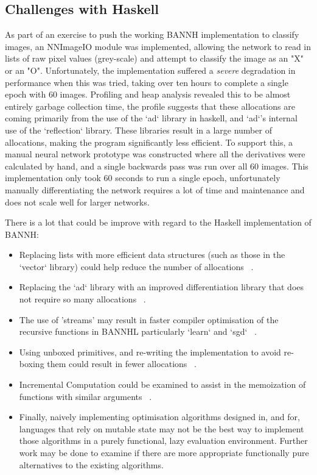 \documentclass[a4paper]{article}
\begin{document}
\subsection{Challenges with Haskell}
As part of an exercise to push the working BANNH implementation to classify
images, an NNImageIO module was implemented, allowing the network to read in
lists of raw pixel values (grey-scale) and attempt to classify the image as an
"X" or an "O". Unfortunately, the implementation suffered a \textit{severe}
degradation in performance when this was tried, taking over ten hours to
complete a single epoch with 60 images. Profiling and heap analysis revealed
this to be almost entirely garbage collection time, the profile suggests that
these allocations are coming primarily from the use of the `ad` library in
haskell, and `ad`'s internal use of the `reflection` library. These libraries
result in a large number of allocations, making the program significantly less
efficient. To support this, a manual neural network prototype was constructed
where all the derivatives were calculated by hand, and a single backwards pass
was run over all 60 images. This implementation only took 60 seconds to run a
single epoch, unfortunately manually differentiating the network requires a lot
of time and maintenance and does not scale well for larger networks.

There is a lot that could be improve with regard to the Haskell implementation
of BANNH:
\begin{itemize}
   \item Replacing lists with more efficient data structures (such as those in
   the `vector` library) could help reduce the number of allocations
   ~\cite{gill2000debugging}.
   \item Replacing the `ad` library with an improved differentiation library
   that does not require so many allocations ~\cite{zimmer2006functional}.
   \item The use of 'streams' may result in faster compiler optimisation of the
   recursive functions in BANNHL particularly `learn` and `sgd`
   ~\cite{ida1983functional}.
   \item Using unboxed primitives, and re-writing the implementation to avoid
   re-boxing them could result in fewer allocations
   ~\cite{chakravarty2003approach}.
   \item Incremental Computation could be examined to assist in the memoization
   of functions with similar arguments
   ~\cite{Elliott-2017-compiling-to-categories}.
   \item Finally, naively implementing optimisation algorithms designed in, and
   for, languages that rely on mutable state may not be the best way to 
   implement those algorithms in a purely functional, lazy evaluation 
   environment. Further work may be done to examine if there are more 
   appropriate functionally pure alternatives to the existing algorithms.
\end{itemize}
\end{document}
